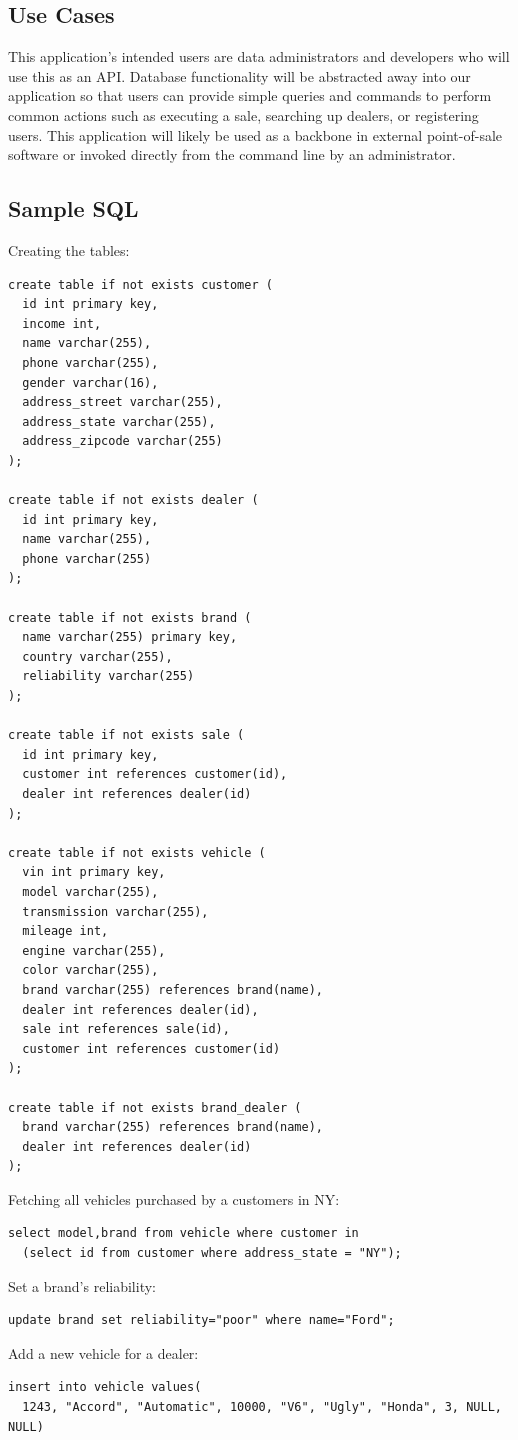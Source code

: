 \documentclass{math}
\begin{document}
\subsection*{Use Cases}
This application's intended users are data administrators and developers who
will use this as an API. Database functionality will be abstracted away into
our application so that users can provide simple queries and commands to
perform common actions such as executing a sale, searching up dealers, or
registering users. This application will likely be used as a backbone in
external point-of-sale software or invoked directly from the command line by
an administrator.

\subsection*{Sample SQL}
Creating the tables:
\begin{lstlisting}
create table if not exists customer (
  id int primary key,
  income int,
  name varchar(255),
  phone varchar(255),
  gender varchar(16),
  address_street varchar(255),
  address_state varchar(255),
  address_zipcode varchar(255)
);

create table if not exists dealer (
  id int primary key,
  name varchar(255),
  phone varchar(255)
);

create table if not exists brand (
  name varchar(255) primary key,
  country varchar(255),
  reliability varchar(255)
);

create table if not exists sale (
  id int primary key,
  customer int references customer(id),
  dealer int references dealer(id)
);

create table if not exists vehicle (
  vin int primary key,
  model varchar(255),
  transmission varchar(255),
  mileage int,
  engine varchar(255),
  color varchar(255),
  brand varchar(255) references brand(name),
  dealer int references dealer(id),
  sale int references sale(id),
  customer int references customer(id)
);

create table if not exists brand_dealer (
  brand varchar(255) references brand(name),
  dealer int references dealer(id)
);
\end{lstlisting}
Fetching all vehicles purchased by a customers in NY:
\begin{lstlisting}
select model,brand from vehicle where customer in
  (select id from customer where address_state = "NY");
\end{lstlisting}
Set a brand's reliability:
\begin{lstlisting}
update brand set reliability="poor" where name="Ford";
\end{lstlisting}
Add a new vehicle for a dealer:
\begin{lstlisting}
insert into vehicle values(
  1243, "Accord", "Automatic", 10000, "V6", "Ugly", "Honda", 3, NULL, NULL)
\end{lstlisting}
\end{document}
